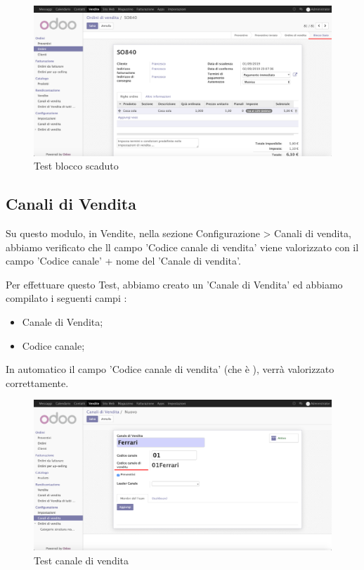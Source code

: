 \begin{figure}[H]
	\begin{center} \includegraphics[scale=0.3]{figures/third_test}
		\caption[Test blocco scaduto]{Test blocco scaduto}
		\label{fig:third_test}
	\end{center}
\end{figure}
\newpage
\subsection{Canali di Vendita}

Su questo modulo, in Vendite, nella sezione Configurazione > Canali di vendita, abbiamo verificato che ll campo 'Codice canale di vendita' viene valorizzato con il campo 'Codice canale' + nome del 'Canale di vendita'.

\vspace*{0.5cm}
Per effettuare questo Test, abbiamo creato un 'Canale di Vendita' ed abbiamo compilato i seguenti campi :
\begin{itemize}
\item Canale di Vendita;
\item Codice canale;
\end{itemize}

In automatico il campo 'Codice canale di vendita' (che è ), verrà valorizzato correttamente.
  
\begin{figure}[H]
	\begin{center} \includegraphics[scale=0.3]{figures/fourth_test}
		\caption[Test canale di vendita]{Test canale di vendita}
		\label{fig:fourth_test}
	\end{center}
\end{figure}


